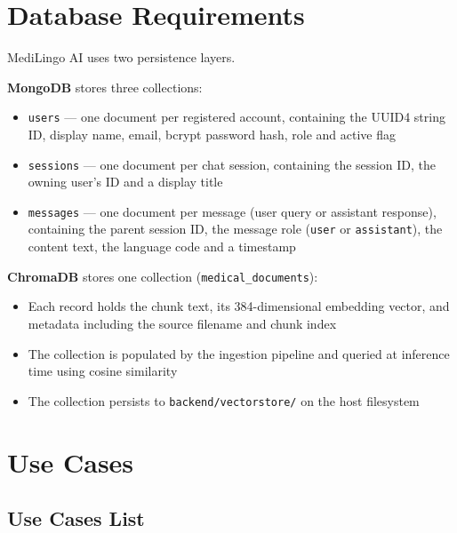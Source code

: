 \section{Database Requirements}

MediLingo AI uses two persistence layers.

\textbf{MongoDB} stores three collections:
\begin{itemize}
  \item \texttt{users} --- one document per registered account, containing the UUID4
        string ID, display name, email, bcrypt password hash, role and active flag
  \item \texttt{sessions} --- one document per chat session, containing the session ID,
        the owning user's ID and a display title
  \item \texttt{messages} --- one document per message (user query or assistant response),
        containing the parent session ID, the message role
        (\texttt{user} or \texttt{assistant}), the content text, the language code and a
        timestamp
\end{itemize}

\textbf{ChromaDB} stores one collection (\texttt{medical\_documents}):
\begin{itemize}
  \item Each record holds the chunk text, its 384-dimensional embedding vector, and
        metadata including the source filename and chunk index
  \item The collection is populated by the ingestion pipeline and queried at inference
        time using cosine similarity
  \item The collection persists to \texttt{backend/vectorstore/} on the host filesystem
\end{itemize}

\section{Use Cases}

\subsection{Use Cases List}

